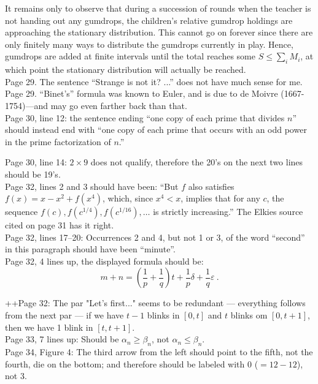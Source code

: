 \documentclass[11pt]{article}
\newcommand{\ep}{\varepsilon}
\begin{document}
It remains only to observe that during a succession of rounds when the teacher is
not handing out any gumdrops, the children's relative gumdrop holdings are approaching
the stationary distribution.  This cannot go on forever since there are only finitely
many ways to distribute the gumdrops currently in play.  Hence, gumdrops are added
at finite intervals until the total reaches some $S \le \sum_i M_i$, at which point
the stationary distribution will actually be reached.\\

Page 29. The sentence ``Strange is not it? ...'' does not have much sense for me.\\

Page 29.  ``Binet's'' formula was known to Euler, and is due to de Moivre (1667-1754)---and
may go even farther back than that.\\

Page 30, line 12: the sentence ending ``one copy of each prime that divides $n$'' should
instead end with ``one copy of each prime that occurs with an odd power in the
prime factorization of $n$.''

Page 30, line 14: $2\times9$ does not qualify, therefore the 20's on the next two lines should be 19's.\\

Page 32, lines 2 and 3 should have been: 
``But $f$ also satisfies $f(x) = x -x^2 + f(x^4)$, which, since $x^4 < x$, implies that for any $c$, the
sequence $f(c),f(c^{1/4}),f(c^{1/16}),\dots$ is strictly increasing.''  The Elkies source cited on page 31
has it right.\\

Page 32, lines 17--20:  Occurrences 2 and 4, but not 1 or 3, of the
word ``second'' in this paragraph should have been ``minute''.\\

Page 32, 4 lines up, the displayed formula should be:
$$
m + n = \left( \frac1p + \frac 1q \right)t + \frac1p \delta + \frac1q \ep~.
$$

++Page 32: The par "Let's first..."  seems to be redundant --- everything follows from
the next par --- if we have $t-1$ blinks in $[0,t]$
and $t$ blinks om $[0,t+1]$, then we have 1 blink in $[t,t+1]$.\\

Page 33, 7 lines up: Should be $\alpha_n \ge \beta_n$, not $\alpha_n \le \beta_n$.\\

Page 34, Figure 4: The third arrow from the left should point to the fifth, not the
fourth, die on the bottom; and therefore should be labeled with 0 ($= 12 - 12$), not 3.\\
\end{document}
